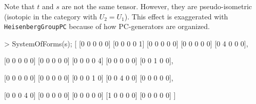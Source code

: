 \begin{example}[CraftingPGroups]
Note that $t$ and $s$ are not the same tensor.
However, they are pseudo-isometric (isotopic in the category with $U_2=U_1$). 
This effect is exaggerated with \texttt{HeisenbergGroupPC} because of how PC-generators are organized.
\begin{code}
> SystemOfForms(s);
[
    [0 0 0 0 0]
    [0 0 0 0 1]
    [0 0 0 0 0]
    [0 0 0 0 0]
    [0 4 0 0 0],

    [0 0 0 0 0]
    [0 0 0 0 0]
    [0 0 0 0 4]
    [0 0 0 0 0]
    [0 0 1 0 0],

    [0 0 0 0 0]
    [0 0 0 0 0]
    [0 0 0 1 0]
    [0 0 4 0 0]
    [0 0 0 0 0],

    [0 0 0 4 0]
    [0 0 0 0 0]
    [0 0 0 0 0]
    [1 0 0 0 0]
    [0 0 0 0 0]
]
\end{code}
\end{example}

